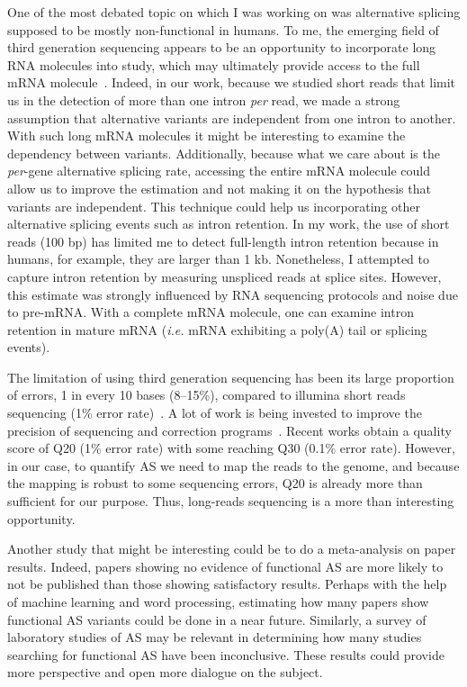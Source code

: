 One of the most debated topic on which I was working on was alternative splicing supposed to be mostly non-functional in humans. To me, the emerging field of third generation sequencing appears to be an opportunity to incorporate long RNA molecules into study, which may ultimately provide access to the full \acrshort{mRNA} molecule~\citep{logsdon_long-read_2020}. Indeed, in our work, because we studied short reads that limit us in the detection of more than one intron \textit{per} read, we made a strong assumption that alternative variants are independent from one intron to another. With such long \acrshort{mRNA} molecules it might be interesting to examine the dependency between variants. Additionally, because what we care about is the \textit{per}-gene alternative splicing rate, accessing the entire \acrshort{mRNA} molecule could allow us to improve the estimation and not making it on the hypothesis that variants are independent. This technique could help us incorporating other alternative splicing events such as intron retention. In my work, the use of short reads (100 bp) has limited me to detect full-length intron retention because in humans, for example, they are larger than 1 \acrshort{kb}. Nonetheless, I attempted to capture intron retention by measuring unspliced reads at splice sites. However, this estimate was strongly influenced by RNA sequencing protocols and noise due to pre-\acrshort{mRNA}. With a complete \acrshort{mRNA} molecule, one can examine intron retention in mature \acrshort{mRNA} (\textit{i.e.} \acrshort{mRNA} exhibiting a poly(A) tail or splicing events).

The limitation of using third generation sequencing has been its large proportion of errors, 1 in every 10 bases (8–15\%), compared to illumina short reads sequencing (1\% error rate)~\citep{morisse_scalable_2021}. A lot of work is being invested to improve the precision of sequencing and correction programs~\citep{luo_vechat_2022}. Recent works obtain a quality score of Q20 (1\% error rate) with some reaching Q30 (0.1\% error rate). However, in our case, to quantify \acrshort{AS} we need to map the reads to the genome, and because the mapping is robust to some sequencing errors, Q20 is already more than sufficient for our purpose. Thus, long-reads sequencing is a more than interesting opportunity.

Another study that might be interesting could be to do a meta-analysis on paper results. Indeed, papers showing no evidence of functional \acrshort{AS} are more likely to not be published than those showing satisfactory results. Perhaps with the help of machine learning and word processing, estimating how many papers show functional \acrshort{AS} variants could be done in a near future. Similarly, a survey of laboratory studies of \acrshort{AS} may be relevant in determining how many studies searching for functional \acrshort{AS} have been inconclusive. These results could provide more perspective and open more dialogue on the subject.


